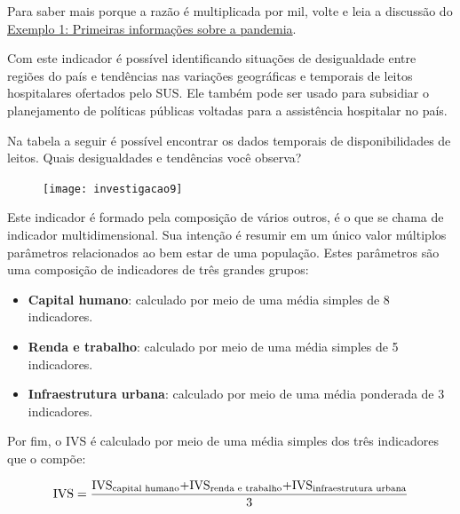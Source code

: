 Para saber mais porque a razão é multiplicada por mil, volte e leia a discussão do \hyperref[primeiras-informacoes]{Exemplo 1: Primeiras informações sobre a pandemia}. 

Com este indicador é possível identificando situações de desigualdade entre regiões do país e tendências nas variações geográficas e temporais de leitos hospitalares ofertados pelo SUS. Ele também pode ser usado para subsidiar o planejamento de políticas públicas voltadas para a assistência hospitalar no país.

Na tabela a seguir é possível encontrar os dados temporais de disponibilidades de leitos. Quais desigualdades e tendências você observa?

\begin{figure}[H]
\centering

\texttt{[image: investigacao9]}
\end{figure}


Este indicador é formado pela composição de vários outros, é o que se chama de indicador multidimensional. Sua intenção é resumir em um único valor múltiplos parâmetros relacionados ao bem estar de uma população. Estes parâmetros são uma composição de indicadores de três grandes grupos:

\begin{itemize}
\item \textbf{Capital humano}: calculado por meio de uma média simples de 8 indicadores.
\item \textbf{Renda e trabalho}: calculado por meio de uma média simples de 5 indicadores.
\item \textbf{Infraestrutura urbana}: calculado por meio de uma média ponderada de 3 indicadores.
\end{itemize}

Por fim, o IVS é calculado por meio de uma média simples dos três indicadores que o compõe:

\begin{equation*}
\text{IVS}=\frac
{\text{IVS\textsubscript{capital humano}+IVS\textsubscript{renda e trabalho}+IVS\textsubscript{infraestrutura urbana}}}
{3}
\end{equation*}

